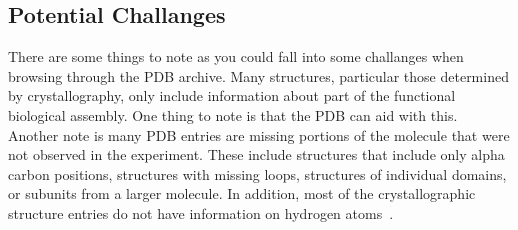\documentclass{report}
\begin{document}
\subsection{Potential Challanges}

There are some things to note as you could fall into some challanges when browsing through the PDB archive. Many structures, particular those determined by crystallography, only include information about part of the functional biological assembly. One thing to note is that the PDB can aid with this. Another note is many PDB entries are missing portions of the molecule that were not observed in the experiment. These include structures that include only alpha carbon positions, structures with missing loops, structures of individual domains, or subunits from a larger molecule. In addition, most of the crystallographic structure entries do not have information on hydrogen atoms~\cite{noauthor_pdb101_nodate}.





\end{document}
